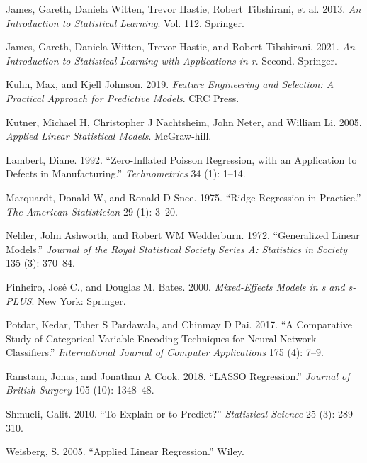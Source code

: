 \documentclass[
  letterpaper,
  DIV=11,
  numbers=noendperiod]{scrreprt}
\newlength{\cslhangindent}
\newenvironment{CSLReferences}[2] %
 {\begin{list}{}{%
  \setlength{\itemindent}{0pt}
  \setlength{\leftmargin}{0pt}
  \setlength{\parsep}{0pt}
  \ifodd #1
   \setlength{\leftmargin}{\cslhangindent}
   \setlength{\itemindent}{-1\cslhangindent}
  \fi
  \setlength{\itemsep}{#2\baselineskip}}}
 {\end{list}}
\begin{document}
\begin{CSLReferences}{1}{0}
James, Gareth, Daniela Witten, Trevor Hastie, Robert Tibshirani, et al.
2013. \emph{An Introduction to Statistical Learning}. Vol. 112.
Springer.

James, Gareth, Daniela Witten, Trevor Hastie, and Robert Tibshirani.
2021. \emph{An Introduction to Statistical Learning with Applications in
r}. Second. Springer.

Kuhn, Max, and Kjell Johnson. 2019. \emph{Feature Engineering and
Selection: A Practical Approach for Predictive Models}. CRC Press.

Kutner, Michael H, Christopher J Nachtsheim, John Neter, and William Li.
2005. \emph{Applied Linear Statistical Models}. McGraw-hill.

Lambert, Diane. 1992. {``Zero-Inflated Poisson Regression, with an
Application to Defects in Manufacturing.''} \emph{Technometrics} 34 (1):
1--14.

Marquardt, Donald W, and Ronald D Snee. 1975. {``Ridge Regression in
Practice.''} \emph{The American Statistician} 29 (1): 3--20.

Nelder, John Ashworth, and Robert WM Wedderburn. 1972. {``Generalized
Linear Models.''} \emph{Journal of the Royal Statistical Society Series
A: Statistics in Society} 135 (3): 370--84.

Pinheiro, José C., and Douglas M. Bates. 2000. \emph{Mixed-Effects
Models in s and s-PLUS}. New York: Springer.

Potdar, Kedar, Taher S Pardawala, and Chinmay D Pai. 2017. {``A
Comparative Study of Categorical Variable Encoding Techniques for Neural
Network Classifiers.''} \emph{International Journal of Computer
Applications} 175 (4): 7--9.

Ranstam, Jonas, and Jonathan A Cook. 2018. {``LASSO Regression.''}
\emph{Journal of British Surgery} 105 (10): 1348--48.

Shmueli, Galit. 2010. {``To Explain or to Predict?''} \emph{Statistical
Science} 25 (3): 289--310.

Weisberg, S. 2005. {``Applied Linear Regression.''} Wiley.


\end{CSLReferences}
\end{document}
